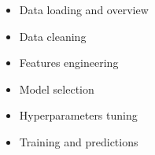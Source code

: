 

\begin{itemize}
	\item Data loading and overview
	\item Data cleaning
	\item Features engineering
	\item Model selection
	\item Hyperparameters tuning
	\item Training and predictions
\end{itemize}





%

